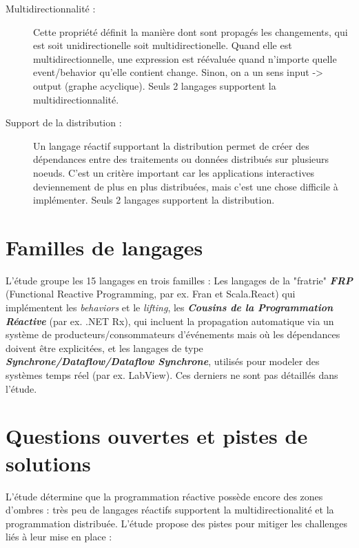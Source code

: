 \documentclass[10pt,final]{IEEEtran}
\begin{document}
\begin{description}
    \item[Multidirectionnalité :]
    Cette propriété définit la manière dont sont propagés les changements, qui est soit unidirectionelle soit multidirectionelle. Quand elle est multidirectionnelle, une expression est réévaluée quand n'importe quelle event/behavior qu'elle contient change. Sinon, on a un sens input -> output (graphe acyclique). Seuls 2 langages supportent la multidirectionnalité.
    
    \item[Support de la distribution :]
    Un langage réactif supportant la distribution permet de créer des dépendances entre des traitements ou données distribués sur plusieurs noeuds. C'est un critère important car les applications interactives deviennement de plus en plus distribuées, mais c'est une chose difficile à implémenter. Seuls 2 langages supportent la distribution.
\end{description}


\section{Familles de langages}

L'étude groupe les 15 langages en trois familles : Les langages de la "fratrie" \textit{\textbf{FRP}} (Functional Reactive Programming, par ex. Fran et Scala.React) qui implémentent les \textit{behaviors} et le \textit{lifting}, les \textit{\textbf{Cousins de la Programmation Réactive}} (par ex. .NET Rx), qui incluent la propagation automatique via un système de producteurs/consommateurs d'événements mais où les dépendances doivent être explicitées, et les langages de type \textit{\textbf{Synchrone/Dataflow/Dataflow Synchrone}}, utilisés pour modeler des systèmes temps réel (par ex. LabView). Ces derniers ne sont pas détaillés dans l'étude.

\section{Questions ouvertes et pistes de solutions}
 
L'étude détermine que la programmation réactive possède encore des zones d'ombres : très peu de langages réactifs supportent la multidirectionalité et la programmation distribuée. L'étude propose des pistes pour mitiger les challenges liés à leur mise en place :
\end{document}
